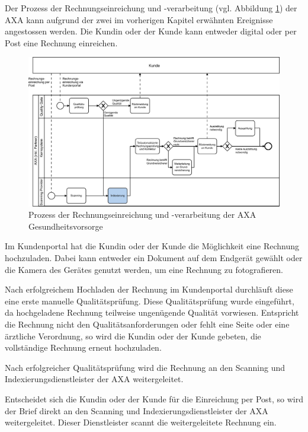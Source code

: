 Der Prozess der Rechnungseinreichung und -verarbeitung (vgl. Abbildung \ref{prozessaxa}) der AXA kann aufgrund der zwei im vorherigen Kapitel erwähnten Ereignisse angestossen werden. Die Kundin oder der Kunde kann entweder digital oder per Post eine Rechnung einreichen. 

\begin{figure}[h]
    \captionsetup{width=.9\linewidth}
    \caption[Prozess der Rechnungseinreichung und -verarbeitung der AXA Gesundheitsvorsorge]{Prozess der Rechnungseinreichung und -verarbeitung der AXA Gesundheitsvorsorge}
    \label{prozessaxa}
    \centering
    \vspace{0.2cm}
    \includegraphics[width=\textwidth]{graphics/rechnungseinreichung-bpmn.pdf}
\end{figure}

Im Kundenportal hat die Kundin oder der Kunde die Möglichkeit eine Rechnung hochzuladen. Dabei kann entweder ein Dokument auf dem Endgerät gewählt oder die Kamera des Gerätes genutzt werden, um eine Rechnung zu fotografieren.

Nach erfolgreichem Hochladen der Rechnung im Kundenportal durchläuft diese eine erste manuelle Qualitätsprüfung. Diese Qualitätsprüfung wurde eingeführt, da hochgeladene Rechnung teilweise ungenügende Qualität vorwiesen. Entspricht die Rechnung nicht den Qualitätsanforderungen oder fehlt eine Seite oder eine ärztliche Verordnung, so wird die Kundin oder der Kunde gebeten, die vollständige Rechnung erneut hochzuladen.

Nach erfolgreicher Qualitätsprüfung wird die Rechnung an den Scanning und Indexierungsdienstleister der AXA weitergeleitet.

Entscheidet sich die Kundin oder der Kunde für die Einreichung per Post, so wird der Brief direkt an den Scanning und Indexierungsdienstleister der AXA weitergeleitet. Dieser Dienstleister scannt die weitergeleitete Rechnung ein.

